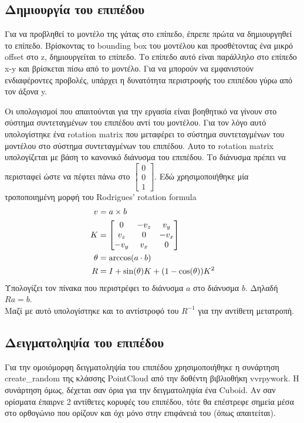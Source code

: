 \documentclass{report}
\begin{document}
\subsection{Δημιουργία του επιπέδου}

Για να προβληθεί το μοντέλο της γάτας στο επίπεδο, έπρεπε πρώτα να δημιουργηθεί το επίπεδο. Βρίσκοντας το bounding box του μοντέλου
και προσθέτοντας ένα μικρό offset στο z, δημιουργείται το επίπεδο. Το επίπεδο αυτό είναι παράλληλο στο επίπεδο x-y και βρίσκεται πίσω
από το μοντέλο. Για να μπορούν να εμφανιστούν ενδιαφέροντες προβολές, υπάρχει η δυνατότητα περιστροφής του επιπέδου γύρω από τον άξονα y.


Οι υπολογισμοί που απαιτούνται για την εργασία είναι βοηθητικό να γίνουν στο σύστημα συντεταγμένων του επιπέδου αντί του μοντέλου.
Για τον λόγο αυτό υπολογίστηκε ένα rotation matrix που μεταφέρει το σύστημα συντεταγμένων του μοντέλου στο σύστημα συντεταγμένων του επιπέδου.
Αυτο το rotation matrix υπολογίζεται με βάση το κανονικό διάνυσμα του επιπέδου. Το διάνυσμα πρέπει να περισταφεί ώστε να
πέφτει πάνω στο $\begin{bmatrix}0 \\ 0 \\ 1\end{bmatrix}$. Εδώ χρησιμοποιήθηκε μία τροποποιημένη μορφή του Rodrigues' rotation formula
\cite{rodrigues-rotation-formula}
\begin{align}
    v &= a \times b \notag \\
    K &= \begin{bmatrix}
        0 & -v_z & v_y \\
        v_z & 0 & -v_x \\
        -v_y & v_x & 0
    \end{bmatrix} \notag \\
    \theta &= \arccos(a \cdot b) \notag \\
    R &= I + \sin(\theta)K + (1 - \cos(\theta))K^2
\end{align}
Υπολογίζει τον πίνακα που περιστρέφει το διάνυσμα $a$ στο διάνυσμα $b$. Δηλαδή $Ra = b$. \\
Μαζί με αυτό υπολογίστηκε και το αντίστροφό του $R^{-1}$ για την αντίθετη μετατροπή.

\subsection{Δειγματοληψία του επιπέδου}
Για την ομοιόμορφη δειγματοληψία του επιπέδου χρησιμοποιήθηκε η συνάρτηση create\_random της κλάσσης PointCloud από
την δοθέντη βιβλιοθήκη vvrpywork. Η συνάρτηση όμως, δέχεται σαν όρια για την δειγματοληψία ένα Cuboid. Αν σαν ορίσματα έπαιρνε 2 αντίθετες
κορυφές του επιπέδου, τότε θα επέστρεφε σημεία μέσα στο ορθογώνιο που ορίζουν και όχι μόνο στην επιφάνειά του (όπως απαιτείται).
\end{document}
